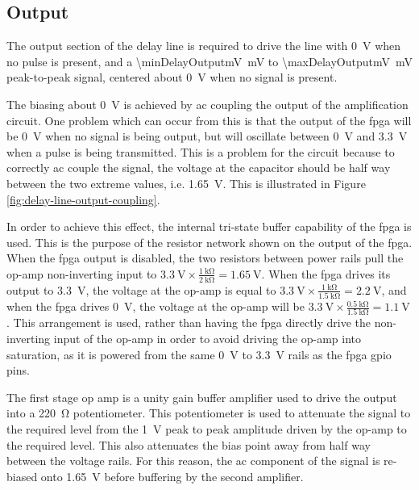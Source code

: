 \subsection{Output} \label{sec:delay-line-ana-output}

The output section of the delay line is required to drive the line with \SI{0}{\volt} when no pulse is present, and a \SI{\minDelayOutputmV}{\milli\volt} to \SI{\maxDelayOutputmV}{\milli\volt} peak-to-peak signal, centered about \SI{0}{\volt} when no signal is present.


The biasing about \SI{0}{\volt} is achieved by \gls{ac} coupling the output of the amplification circuit. One problem which can occur from this is that the output of the \gls{fpga} will be \SI{0}{\volt} when no signal is being output, but will oscillate between \SI{0}{\volt} and \SI{3.3}{\volt} when a pulse is being transmitted. This is a problem for the circuit because to correctly \gls{ac} couple the signal, the voltage at the capacitor should be half way between the two extreme values, i.e. \SI{1.65}{\volt}. This is illustrated in Figure \ref{fig:delay-line-output-coupling}.

In order to achieve this effect, the internal tri-state buffer capability of the \gls{fpga} is used. This is the purpose of the resistor network shown on the output of the \gls{fpga}. When the \gls{fpga} output is disabled, the two resistors between power rails pull the op-amp non-inverting input to $\SI{3.3}{\volt} \times\frac{\SI{1}{\kilo\ohm}}{\SI{2}{\kilo\ohm}} = \SI{1.65}{\volt}$. When the \gls{fpga} drives its output to \SI{3.3}{\volt}, the voltage at the op-amp is equal to $\SI{3.3}{\volt} \times\frac{\SI{1}{\kilo\ohm}}{\SI{1.5}{\kilo\ohm}} = \SI{2.2}{\volt}$, and when the \gls{fpga} drives \SI{0}{\volt}, the voltage at the op-amp will be $\SI{3.3}{\volt} \times\frac{\SI{0.5}{\kilo\ohm}}{\SI{1.5}{\kilo\ohm}} = \SI{1.1}{\volt}$. This arrangement is used, rather than having the \gls{fpga} directly drive the non-inverting input of the op-amp in order to avoid driving the op-amp into saturation, as it is powered from the same \SI{0}{\volt} to \SI{3.3}{\volt} rails as the \gls{fpga} \gls{gpio} pins.

The first stage op amp is a unity gain buffer amplifier used to drive the output into a \SI{220}{\ohm} potentiometer. This potentiometer is used to attenuate the signal to the required level from the \SI{1}{\volt} peak to peak amplitude driven by the op-amp to the required level. This also attenuates the bias point away from half way between the voltage rails. For this reason, the \gls{ac} component of the signal is re-biased onto \SI{1.65}{\volt} before buffering by the second amplifier.

